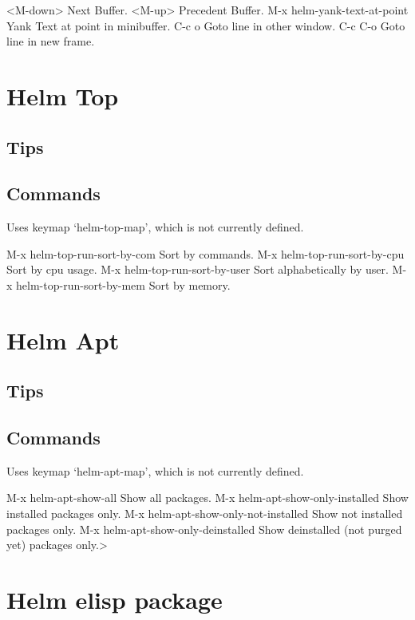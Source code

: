 \documentclass[11pt]{article}
\begin{document}
<M-down>		Next Buffer.
<M-up>		Precedent Buffer.
M-x helm-yank-text-at-point		Yank Text at point in minibuffer.
C-c o		Goto line in other window.
C-c C-o		Goto line in new frame.

\section{Helm Top}
\label{sec:org5b38240}

\subsection{Tips}
\label{sec:orgeb8a16b}

\subsection{Commands}
\label{sec:orgda7f26a}

Uses keymap ‘helm-top-map’, which is not currently defined.

M-x helm-top-run-sort-by-com		Sort by commands.
M-x helm-top-run-sort-by-cpu		Sort by cpu usage.
M-x helm-top-run-sort-by-user		Sort alphabetically by user.
M-x helm-top-run-sort-by-mem		Sort by memory.

\section{Helm Apt}
\label{sec:orge43f987}

\subsection{Tips}
\label{sec:org0833685}

\subsection{Commands}
\label{sec:org4b99bb6}

Uses keymap ‘helm-apt-map’, which is not currently defined.

M-x helm-apt-show-all		Show all packages.
M-x helm-apt-show-only-installed		Show installed packages only.
M-x helm-apt-show-only-not-installed		Show not installed packages only.
M-x helm-apt-show-only-deinstalled		Show deinstalled (not purged yet) packages only.>

\section{Helm elisp package}
\label{sec:orge642d4d}
\end{document}
